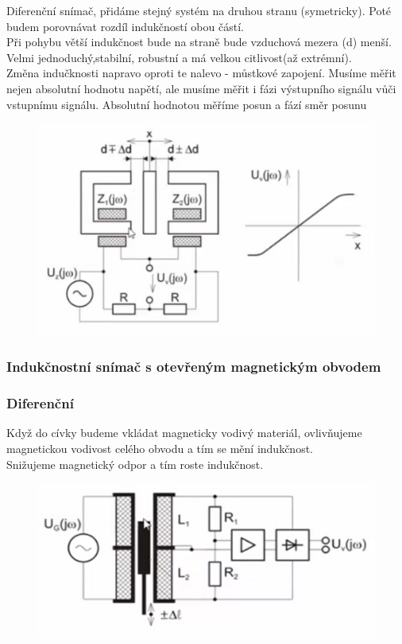 Diferenční snímač, přidáme stejný systém na druhou stranu (symetricky). Poté budem porovnávat rozdíl indukčností obou částí.\\
Při pohybu větší indukčnost bude na straně bude vzduchová mezera (d) menší.\\
Velmi jednoduchý,stabilní, robustní a má velkou citlivost(až extrémní).\\
Změna indučknosti napravo oproti te nalevo - můstkové zapojení. Musíme měřit nejen absolutní hodnotu napětí, ale musíme měřit i fázi výstupního signálu vůči vstupnímu signálu. Absolutní hodnotou měříme posun a fází směr posunu\
\begin{figure}[h!]
    \centering
    \includegraphics[scale = 0.1]{img/IndukDif.png}
\end{figure}

\subsubsection{Indukčnostní snímač s otevřeným magnetickým obvodem}
\subsubsection*{Diferenční}
Když do cívky budeme vkládat magneticky vodivý materiál, ovlivňujeme magnetickou vodivost celého obvodu a tím se mění indukčnost.\\
Snižujeme magnetický odpor a tím roste indukčnost.\\

\begin{figure}[h!]
    \centering
    \includegraphics[scale = 0.1]{img/DifOtInd.png}
\end{figure}

